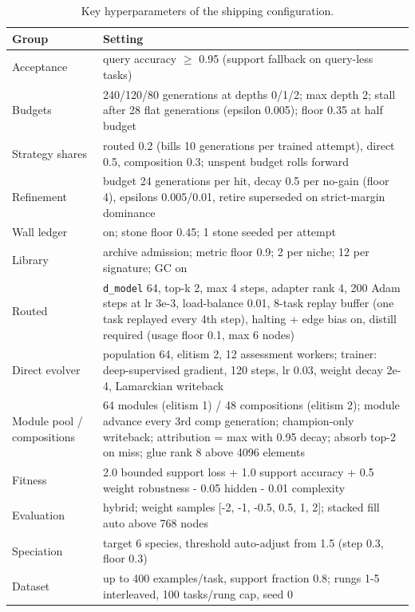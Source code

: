 \documentclass[11pt]{article}
\begin{document}
\begin{table}[htbp]
\centering
\small
\caption{Key hyperparameters of the shipping configuration.}
\label{tab:hyperparameters}
\begin{tabularx}{\textwidth}{@{}l L@{}}
\toprule
Group & Setting \\
\midrule
Acceptance & query accuracy $\geq$ 0.95 (support fallback on query-less tasks) \\
Budgets & 240/120/80 generations at depths 0/1/2; max depth 2; stall after 28 flat generations (epsilon 0.005); floor 0.35 at half budget \\
Strategy shares & routed 0.2 (bills 10 generations per trained attempt), direct 0.5, composition 0.3; unspent budget rolls forward \\
Refinement & budget 24 generations per hit, decay 0.5 per no-gain (floor 4), epsilons 0.005/0.01, retire superseded on strict-margin dominance \\
Wall ledger & on; stone floor 0.45; 1 stone seeded per attempt \\
Library & archive admission; metric floor 0.9; 2 per niche; 12 per signature; GC on \\
Routed & \texttt{d_model} 64, top-k 2, max 4 steps, adapter rank 4, 200 Adam steps at lr 3e-3, load-balance 0.01, 8-task replay buffer (one task replayed every 4th step), halting + edge bias on, distill required (usage floor 0.1, max 6 nodes) \\
Direct evolver & population 64, elitism 2, 12 assessment workers; trainer: deep-supervised gradient, 120 steps, lr 0.03, weight decay 2e-4, Lamarckian writeback \\
Module pool / compositions & 64 modules (elitism 1) / 48 compositions (elitism 2); module advance every 3rd comp generation; champion-only writeback; attribution = max with 0.95 decay; absorb top-2 on miss; glue rank 8 above 4096 elements \\
Fitness & 2.0 bounded support loss + 1.0 support accuracy + 0.5 weight robustness - 0.05 hidden - 0.01 complexity \\
Evaluation & hybrid; weight samples [-2, -1, -0.5, 0.5, 1, 2]; stacked fill auto above 768 nodes \\
Speciation & target 6 species, threshold auto-adjust from 1.5 (step 0.3, floor 0.3) \\
Dataset & up to 400 examples/task, support fraction 0.8; rungs 1-5 interleaved, 100 tasks/rung cap, seed 0 \\
\bottomrule
\end{tabularx}
\end{table}
\end{document}
